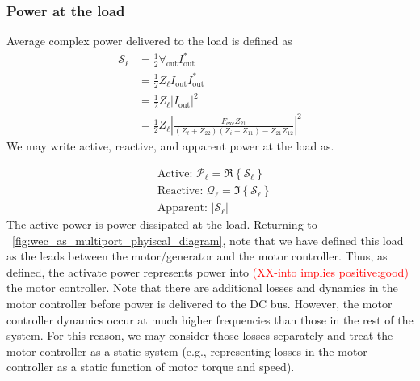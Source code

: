 \documentclass[lettersize,journal]{IEEEtran}
\newcommand{\rc}[1]{\textcolor{red}{#1}}
\begin{document}
\subsubsection{Power at the load}\label{sec:power_at_the_load}
Average complex power delivered to the load is defined as 
\begin{equation}
\begin{aligned}
        \mathcal{S}_{\ell} 
        &= \frac{1}{2} \forall_{\textrm{out}} I_{\textrm{out}}^* \\
        &= \frac{1}{2} Z_\ell I_{\textrm{out}} I_{\textrm{out}}^* \\
        &= \frac{1}{2} Z_\ell | I_{\textrm{out}} |^2 \\
        &= \frac{1}{2} Z_\ell \left| \frac{F_{\textrm{exc}} Z_{21}}{ (Z_\ell + Z_{22}) (Z_i + Z_{11}) - Z_{21} Z_{12}  } \right|^2 
\end{aligned}
\end{equation}
\noindent{}We may write active, reactive, and apparent power at the load as.

\begin{subequations}
\begin{align}
&\textrm{Active: } \mathcal{P}_{\ell} = \Re \left\{ \mathcal{S}_{\ell} \right\} \\[0.5em]
&\textrm{Reactive: } \mathcal{Q}_{\ell} = \Im \left\{ \mathcal{S}_{\ell} \right\} \\[0.5em]
&\textrm{Apparent: } | \mathcal{S}_{\ell} |
\end{align}
\label{eq:load_power_types}
\end{subequations}
\noindent{}The active power is power dissipated at the load.
Returning to \figurename~\ref{fig:wec_as_multiport_phyiscal_diagram}, note that we have defined this load as the leads between the motor/generator and the motor controller.
Thus, as defined, the activate power represents power into \rc{(XX-into implies positive:good)} the motor controller.
Note that there are additional losses and dynamics in the motor controller before power is delivered to the DC bus.
However, the motor controller dynamics occur at much higher frequencies than those in the rest of the system.
For this reason, we may consider those losses separately and treat the motor controller as a static system (e.g., representing losses in the motor controller as a static function of motor torque and speed).

\end{document}

